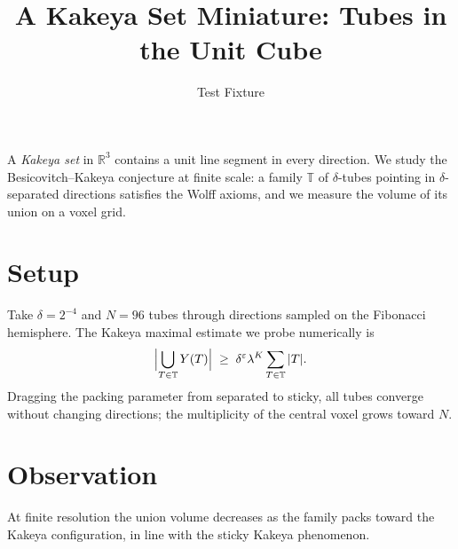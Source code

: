 \documentclass[11pt]{article}
\title{A Kakeya Set Miniature: Tubes in the Unit Cube}
\author{Test Fixture}
\date{}
\begin{document}
\maketitle

A \emph{Kakeya set} in $\mathbb{R}^{3}$ contains a unit line segment in every
direction. We study the Besicovitch--Kakeya conjecture at finite scale: a
family $\mathbb{T}$ of $\delta$-tubes pointing in $\delta$-separated
directions satisfies the Wolff axioms, and we measure the volume of its union
on a voxel grid.

\section{Setup}
Take $\delta = 2^{-4}$ and $N = 96$ tubes through directions sampled on the
Fibonacci hemisphere. The Kakeya maximal estimate we probe numerically is
\[
\Bigl|\bigcup_{T\in\mathbb{T}} Y(T)\Bigr| \;\ge\; \delta^{\varepsilon}
\lambda^{K} \sum_{T\in\mathbb{T}} |T|.
\]
Dragging the packing parameter from separated to sticky, all tubes converge
without changing directions; the multiplicity of the central voxel grows
toward $N$.

\section{Observation}
At finite resolution the union volume decreases as the family packs toward
the Kakeya configuration, in line with the sticky Kakeya phenomenon.
\end{document}

